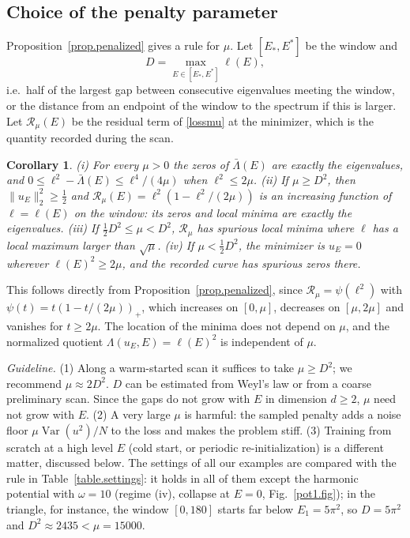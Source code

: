 \documentclass[10pt]{amsart}
\newenvironment{revblock}{\color{blue}}{}
\theoremstyle{definition}
\theoremstyle{remark}
\theoremstyle{plain}
\newtheorem{corollary}[theorem]{Corollary}
\begin{document}
\subsection{Choice of the penalty parameter}\label{sec.mu}
\begin{revblock}
Proposition~\ref{prop.penalized} gives a rule for $\mu$. Let $[E_*,E^*]$ be the window and
\[
D=\max_{E\in[E_*,E^*]}\ell(E),
\]
i.e.\ half of the largest gap between consecutive eigenvalues meeting the window, or the distance from
an endpoint of the window to the spectrum if this is larger. Let $\mathcal R_\mu(E)$ be the residual term of
\eqref{lossmu} at the minimizer, which is the quantity recorded during the scan.

\begin{corollary}\label{cor.mu}
(i) For every $\mu>0$ the zeros of $\bar\Lambda(E)$ are exactly the eigenvalues, and
$0\le \ell^2-\bar\Lambda(E)\le \ell^4/(4\mu)$ when $\ell^2\le2\mu$. (ii) If $\mu\ge D^2$, then
$\|u_E\|_2^2\ge\frac12$ and $\mathcal R_\mu(E)=\ell^2(1-\ell^2/(2\mu))$ is an increasing function of $\ell=\ell(E)$ on the
window: its zeros and local minima are exactly the eigenvalues. (iii) If $\frac12D^2\le\mu<D^2$,
$\mathcal R_\mu$ has spurious local minima where $\ell$ has a local maximum larger than $\sqrt\mu$. (iv) If
$\mu<\frac12D^2$, the minimizer is $u_E=0$ wherever $\ell(E)^2\ge2\mu$, and the recorded curve has
spurious zeros there.
\end{corollary}
This follows directly from Proposition~\ref{prop.penalized}, since $\mathcal R_\mu=\psi(\ell^2)$ with
$\psi(t)=t(1-t/(2\mu))_+$, which increases on $[0,\mu]$, decreases on $[\mu,2\mu]$ and vanishes for
$t\ge2\mu$. The location of the minima does not depend on $\mu$, and the normalized quotient
$\Lambda(u_E,E)=\ell(E)^2$ is independent of $\mu$.

\emph{Guideline.} (1) Along a warm-started scan it suffices to take $\mu\ge D^2$; we recommend
$\mu\approx2D^2$. $D$ can be estimated from Weyl's law or from a coarse preliminary scan. Since the
gaps do not grow with $E$ in dimension $d\ge2$, $\mu$ need not grow with $E$. (2) A very large $\mu$ is
harmful: the sampled penalty adds a noise floor $\mu\operatorname{Var}(u^2)/N$ to the loss and makes
the problem stiff. (3) Training from scratch at a high level $E$ (cold start, or periodic
re-initialization) is a different matter, discussed below. The settings of all our examples are
compared with the rule in Table~\ref{table.settings}: it holds in all of them except the harmonic
potential with $\omega=10$ (regime (iv), collapse at $E=0$, Fig.~\ref{pot1.fig}); in the triangle, for instance, the window $[0,180]$ starts far below
$E_1=5\pi^2$, so $D=5\pi^2$ and $D^2\approx2435<\mu=15000$.


\end{revblock}
\end{document}
